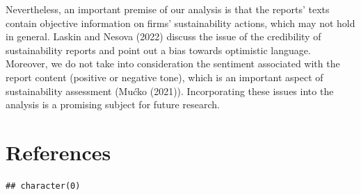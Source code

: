 \documentclass[
]{article}
\begin{document}
Nevertheless, an important premise of our analysis is that the reports' texts contain objective information on firms' sustainability actions, which may not hold in general. Laskin and Nesova (2022) discuss the issue of the credibility of sustainability reports and point out a bias towards optimistic language. Moreover, we do not take into consideration the sentiment associated with the report content (positive or negative tone), which is an important aspect of sustainability assessment (Mućko (2021)). Incorporating these issues into the analysis is a promising subject for future research.

\hypertarget{references}{%
\section*{References}\label{references}}

\begin{verbatim}
## character(0)
\end{verbatim}
\end{document}
